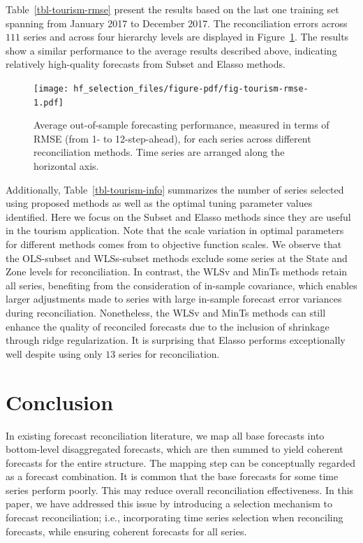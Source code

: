 \documentclass[
  11pt]{article}
\begin{document}
Table~\ref{tbl-tourism-rmse} present the results based on the last one
training set spanning from January 2017 to December 2017. The
reconciliation errors across \(111\) series and across four hierarchy
levels are displayed in Figure~\ref{fig-tourism-rmse}. The results show
a similar performance to the average results described above, indicating
relatively high-quality forecasts from Subset and Elasso methods.

\begin{figure}[!t]

{\centering \texttt{[image: hf\_selection\_files/figure-pdf/fig-tourism-rmse-1.pdf]}

}

\caption{\label{fig-tourism-rmse}Average out-of-sample forecasting
performance, measured in terms of RMSE (from 1- to 12-step-ahead), for
each series across different reconciliation methods. Time series are
arranged along the horizontal axis.}

\end{figure}

Additionally, Table~\ref{tbl-tourism-info} summarizes the number of
series selected using proposed methods as well as the optimal tuning
parameter values identified. Here we focus on the Subset and Elasso
methods since they are useful in the tourism application. Note that the
scale variation in optimal parameters for different methods comes from
to objective function scales. We observe that the OLS-subset and
WLSs-subset methods exclude some series at the State and Zone levels for
reconciliation. In contrast, the WLSv and MinTs methods retain all
series, benefiting from the consideration of in-sample covariance, which
enables larger adjustments made to series with large in-sample forecast
error variances during reconciliation. Nonetheless, the WLSv and MinTs
methods can still enhance the quality of reconciled forecasts due to the
inclusion of shrinkage through ridge regularization. It is surprising
that Elasso performs exceptionally well despite using only \(13\) series
for reconciliation.

\hypertarget{sec-conclusion}{%
\section{Conclusion}\label{sec-conclusion}}

In existing forecast reconciliation literature, we map all base
forecasts into bottom-level disaggregated forecasts, which are then
summed to yield coherent forecasts for the entire structure. The mapping
step can be conceptually regarded as a forecast combination. It is
common that the base forecasts for some time series perform poorly. This
may reduce overall reconciliation effectiveness. In this paper, we have
addressed this issue by introducing a selection mechanism to forecast
reconciliation; i.e., incorporating time series selection when
reconciling forecasts, while ensuring coherent forecasts for all series.
\end{document}
